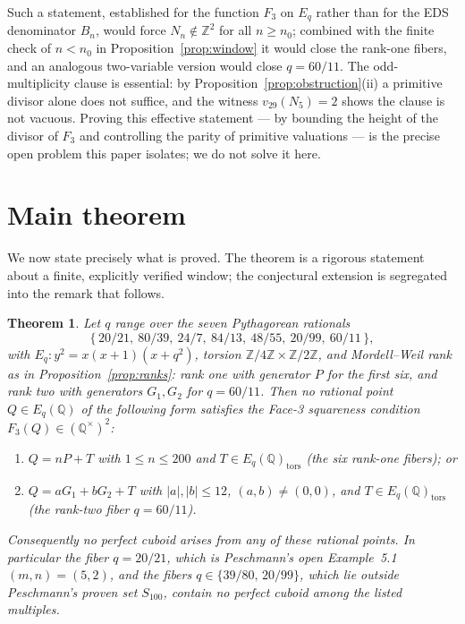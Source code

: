 \documentclass[11pt,reqno]{amsart}
\theoremstyle{plain}
\newtheorem{theorem}{Theorem}[section]
\theoremstyle{definition}
\newcommand{\Q}{\mathbb{Q}}
\newcommand{\Z}{\mathbb{Z}}
\begin{document}
Such a statement, established for the function $F_3$ on $E_q$ rather than for the
EDS denominator $B_n$, would force $N_n\notin\Z^2$ for all $n\ge n_0$; combined
with the finite check of $n<n_0$ in Proposition~\ref{prop:window} it would close
the rank-one fibers, and an analogous two-variable version would close $q=60/11$.
The odd-multiplicity clause is essential: by Proposition~\ref{prop:obstruction}(ii)
a primitive divisor alone does not suffice, and the witness $v_{29}(N_5)=2$ shows
the clause is not vacuous. Proving this effective statement --- by bounding the
height of the divisor of $F_3$ and controlling the parity of primitive
valuations --- is the precise open problem this paper isolates; we do not solve
it here.

\section{Main theorem}

We now state precisely what is proved. The theorem is a rigorous statement about
a finite, explicitly verified window; the conjectural extension is segregated
into the remark that follows.

\begin{theorem}\label{thm:main}
Let $q$ range over the seven Pythagorean rationals
\[
  \{\,20/21,\ 80/39,\ 24/7,\ 84/13,\ 48/55,\ 20/99,\ 60/11\,\},
\]
with $E_q\colon y^2=x(x+1)(x+q^2)$, torsion $\Z/4\Z\times\Z/2\Z$, and
Mordell--Weil rank as in Proposition~\textup{\ref{prop:ranks}}: rank one with
generator $P$ for the first six, and rank two with generators $G_1,G_2$ for
$q=60/11$. Then no rational point $Q\in E_q(\Q)$ of the following form satisfies
the Face-3 squareness condition $F_3(Q)\in(\Q^\times)^2$:
\begin{enumerate}
\item[(a)] $Q=nP+T$ with $1\le n\le 200$ and $T\in E_q(\Q)_{\mathrm{tors}}$
(the six rank-one fibers); or
\item[(b)] $Q=aG_1+bG_2+T$ with $|a|,|b|\le 12$, $(a,b)\neq(0,0)$, and
$T\in E_q(\Q)_{\mathrm{tors}}$ (the rank-two fiber $q=60/11$).
\end{enumerate}
Consequently no perfect cuboid arises from any of these rational points. In
particular the fiber $q=20/21$, which is Peschmann's open Example~5.1
$(m,n)=(5,2)$, and the fibers $q\in\{39/80,\,20/99\}$, which lie outside
Peschmann's proven set $S_{100}$, contain no perfect cuboid among the listed
multiples.
\end{theorem}
\end{document}
